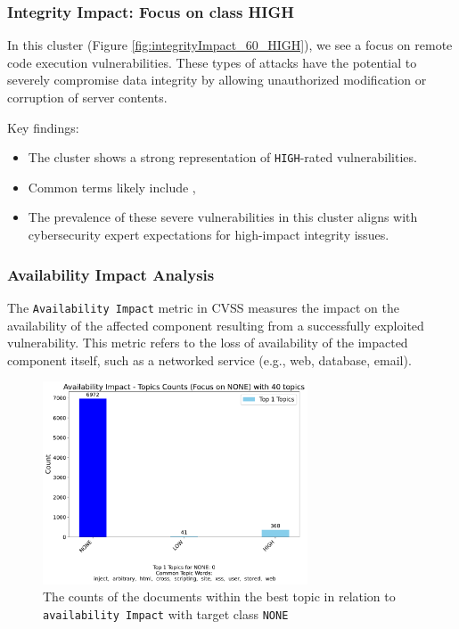 \documentclass[12pt]{article}
\begin{document}
\subsubsection{Integrity Impact: Focus on class HIGH}

In this cluster (Figure \ref{fig:integrityImpact_60_HIGH}), we see a focus on remote code execution vulnerabilities. These
types of attacks have the potential to severely compromise data integrity by allowing unauthorized
modification or corruption of server contents.

Key findings:
\begin{itemize}

	\item The cluster shows a strong representation of \texttt{HIGH}-rated vulnerabilities.

	\item Common terms likely include , 

	\item The prevalence of these severe vulnerabilities in this cluster aligns with cybersecurity
	      expert expectations for high-impact integrity issues.

\end{itemize}

\subsubsection{Availability Impact Analysis}

The \texttt{Availability Impact} metric in CVSS measures the impact on the availability of the
affected component resulting from a successfully exploited vulnerability. This metric refers to the
loss of availability of the impacted component itself, such as a networked service (e.g., web,
database, email).

\begin{figure}[H]
	\centering
	\includegraphics[width=0.7\textwidth]{figures/availabilityImpact/merged_top_k_topics_category_focus_counts_availabilityImpact_NONE_k1.pdf}

	\caption{The counts of the documents within the best topic in relation to \texttt{availability
			Impact} with
		target class \texttt{NONE}}

	\label{fig:availabilityImpact_60_NONE}
\end{figure}
\end{document}
